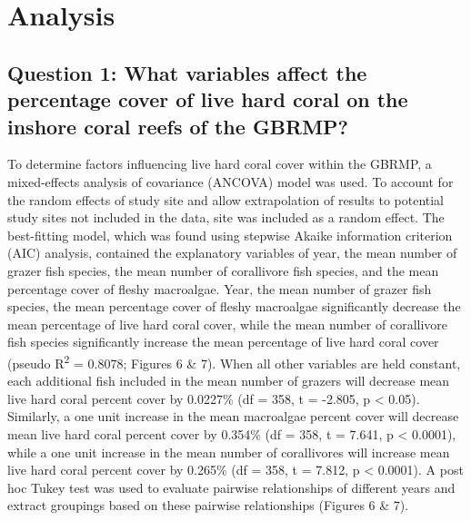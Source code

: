 \documentclass[12pt,]{article}
\begin{document}
\newpage

\hypertarget{analysis}{%
\section{Analysis}\label{analysis}}

\hypertarget{question-1-what-variables-affect-the-percentage-cover-of-live-hard-coral-on-the-inshore-coral-reefs-of-the-gbrmp}{%
\subsection{Question 1: What variables affect the percentage cover of
live hard coral on the inshore coral reefs of the
GBRMP?}\label{question-1-what-variables-affect-the-percentage-cover-of-live-hard-coral-on-the-inshore-coral-reefs-of-the-gbrmp}}

To determine factors influencing live hard coral cover within the GBRMP,
a mixed-effects analysis of covariance (ANCOVA) model was used. To
account for the random effects of study site and allow extrapolation of
results to potential study sites not included in the data, site was
included as a random effect. The best-fitting model, which was found
using stepwise Akaike information criterion (AIC) analysis, contained
the explanatory variables of year, the mean number of grazer fish
species, the mean number of corallivore fish species, and the mean
percentage cover of fleshy macroalgae. Year, the mean number of grazer
fish species, the mean percentage cover of fleshy macroalgae
significantly decrease the mean percentage of live hard coral cover,
while the mean number of corallivore fish species significantly increase
the mean percentage of live hard coral cover (pseudo
R\textsuperscript{2} = 0.8078; Figures 6 \& 7). When all other variables
are held constant, each additional fish included in the mean number of
grazers will decrease mean live hard coral percent cover by 0.0227\% (df
= 358, t = -2.805, p \textless{} 0.05). Similarly, a one unit increase
in the mean macroalgae percent cover will decrease mean live hard coral
percent cover by 0.354\% (df = 358, t = 7.641, p \textless{} 0.0001),
while a one unit increase in the mean number of corallivores will
increase mean live hard coral percent cover by 0.265\% (df = 358, t =
7.812, p \textless{} 0.0001). A post hoc Tukey test was used to evaluate
pairwise relationships of different years and extract groupings based on
these pairwise relationships (Figures 6 \& 7).
\end{document}
